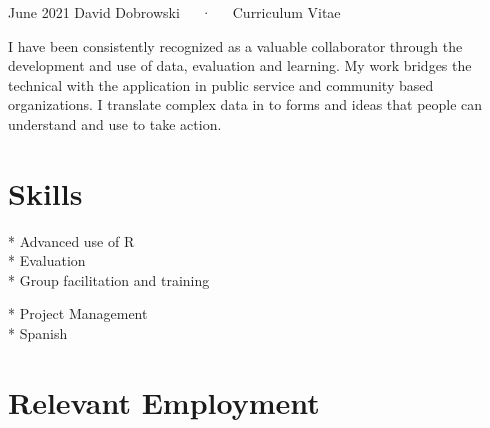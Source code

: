 \documentclass[11pt, a4paper]{awesome-cv}
\begin{document}
\makecvheader

\makecvfooter
  {June 2021}
    {David Dobrowski~~~·~~~Curriculum Vitae}
  {\thepage}





I have been consistently recognized as a valuable collaborator through
the development and use of data, evaluation and learning. My work
bridges the technical with the application in public service and
community based organizations. I translate complex data in to forms and
ideas that people can understand and use to take action.

\hypertarget{skills}{%
\section{Skills}\label{skills}}

\begin{minipage}[t]{0.5\textwidth}
 * Advanced use of R \\
 * Evaluation \\
 * Group facilitation and training \\
\end{minipage}
\begin{minipage}[t]{0.5\textwidth}
 * Project Management \\
 * Spanish \\
\end{minipage}

\hypertarget{relevant-employment}{%
\section{Relevant Employment}\label{relevant-employment}}

\footnotesize
\end{document}
